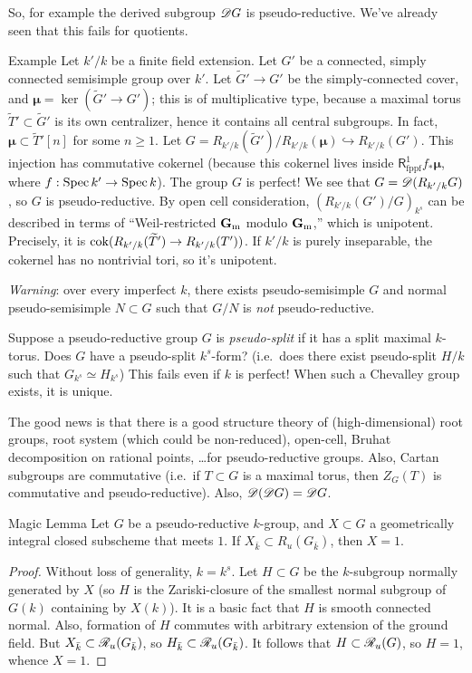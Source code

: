 So, for example the derived subgroup $\mathscr{D} G$ is pseudo-reductive. We've already 
seen that this fails for quotients. 

\begin{enonce}[remark]{Example}
Let $k'/k$ be a finite field extension. Let $G'$ be a connected, simply connected 
semisimple group over $k'$. Let $\widetilde G' \to G'$ be the simply-connected 
cover, and $\boldsymbol\mu=\ker(\widetilde G' \to G')$; this is of multiplicative 
type, because a maximal torus $\widetilde T'\subset \widetilde G'$ is its own 
centralizer, hence it contains all central subgroups. In fact, 
$\boldsymbol\mu\subset \widetilde T'[n]$ for some $n\geqslant 1$. Let 
$G=R_{k'/k}(\widetilde G')/R_{k'/k}(\boldsymbol\mu)\hookrightarrow R_{k'/k}(G')$. 
This injection has commutative cokernel (because this cokernel lives inside 
$\mathsf R_\mathrm{fppf}^1 f_\ast \boldsymbol\mu$, where 
$f:\operatorname{Spec} k' \to \operatorname{Spec} k$). The group $G$ is perfect! We see that 
$G=\mathscr{D}(R_{k'/k} G)$, so $G$ is pseudo-reductive. By open cell consideration, 
$(R_{k'/k}(G')/G)_{k^s}$ can be described in terms of ``Weil-restricted $\mathbf{G}_{\mathrm{m}}$ 
modulo $\mathbf{G}_{\mathrm{m}}$,'' which is unipotent. Precisely, it is 
$\operatorname{cok}(R_{k'/k}(\widetilde T') \to R_{k'/k}(T'))$. If $k'/k$ is purely 
inseparable, the cokernel has no nontrivial tori, so it's unipotent. 
\end{enonce}

\emph{Warning}: over every imperfect $k$, there exists pseudo-semisimple $G$ 
and normal pseudo-semisimple $N\subset G$ such that $G/N$ is \emph{not} 
pseudo-reductive. 

Suppose a pseudo-reductive group $G$ is \emph{pseudo-split} if it has a split 
maximal $k$-torus. Does $G$ have a pseudo-split $k^s$-form? (i.e.\ does there 
exist pseudo-split $H/k$ such that $G_{k^s}\simeq H_{k^s}$) This fails even 
if $k$ is perfect! When such a Chevalley group exists, it is unique. 

The good news is that there is a good structure theory of (high-dimensional) 
root groups, root system (which could be non-reduced), open-cell, Bruhat 
decomposition on rational points, \ldots for pseudo-reductive groups. Also, 
Cartan subgroups are commutative (i.e.\ if $T\subset G$ is a maximal torus, 
then $Z_G(T)$ is commutative and pseudo-reductive). Also, 
$\mathscr{D}(\mathscr{D} G)=\mathscr{D} G$. 

\begin{enonce}{Magic Lemma}
Let $G$ be a pseudo-reductive $k$-group, and $X\subset G$ a geometrically 
integral closed subscheme that meets $1$. If $X_{\bar k}\subset R_u(G_{\bar k})$, 
then $X=1$. 
\end{enonce}
\begin{proof}
Without loss of generality, $k=k^s$. Let $H\subset G$ be the $k$-subgroup 
normally generated by $X$ (so $H$ is the Zariski-closure of the smallest normal 
subgroup of $G(k)$ containing by $X(k)$). It is a basic fact that $H$ is 
smooth connected normal. Also, formation of $H$ commutes with arbitrary 
extension of the ground field. But $X_{\bar k}\subset \mathscr{R}_u(G_{\bar k})$, so 
$H_{\bar k}\subset \mathscr{R}_u(G_{\bar k})$. It follows that $H\subset \mathscr{R}_u(G)$, so 
$H=1$, whence $X=1$. 
\end{proof}

